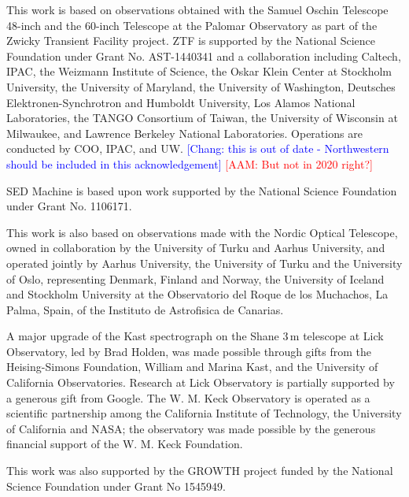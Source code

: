 \documentclass[twocolumn]{aastex631}
\newcommand{\adam}[1]{\textcolor{red}{[AAM: #1]}}
\newcommand{\chang}[1]{\textcolor{blue}{[Chang: #1]}}
\begin{document}
This work is based on observations obtained with the Samuel Oschin Telescope 48-inch and the 60-inch Telescope at the Palomar Observatory as part of the Zwicky Transient Facility project. ZTF is supported by the National Science Foundation under Grant No. AST-1440341 and a collaboration including Caltech, IPAC, the Weizmann Institute of Science, the Oskar Klein Center at Stockholm University, the University of Maryland, the University of Washington, Deutsches Elektronen-Synchrotron and Humboldt University, Los Alamos National Laboratories, the TANGO Consortium of Taiwan, the University of Wisconsin at Milwaukee, and Lawrence Berkeley National Laboratories. Operations are conducted by COO, IPAC, and UW. \chang{this is out of date - Northwestern should be included in this acknowledgement} \adam{But not in 2020 right?}

SED Machine is based upon work supported by the National Science Foundation under Grant No. 1106171.

This work is also based on observations made with the Nordic Optical Telescope, owned in collaboration by the University of Turku and Aarhus University, and operated jointly by Aarhus University, the University of Turku and the University of Oslo, representing Denmark, Finland and Norway, the University of Iceland and Stockholm University at the Observatorio del Roque de los Muchachos, La Palma, Spain, of the Instituto de Astrofisica de Canarias.

A major upgrade of the Kast spectrograph on the Shane 3\,m telescope at Lick Observatory, led by Brad Holden, was made possible through gifts from the Heising-Simons Foundation, William and Marina Kast, and the University of California Observatories. Research at Lick Observatory is partially supported by a generous gift from Google. The W. M. Keck Observatory is operated as a scientific partnership among the California Institute of Technology, the University of California and NASA; the observatory was made possible by the generous financial support of the W. M. Keck Foundation.

This work was also supported by the GROWTH project \citep{Kasliwal2019} funded by the National Science Foundation under Grant No 1545949.

\end{document}
